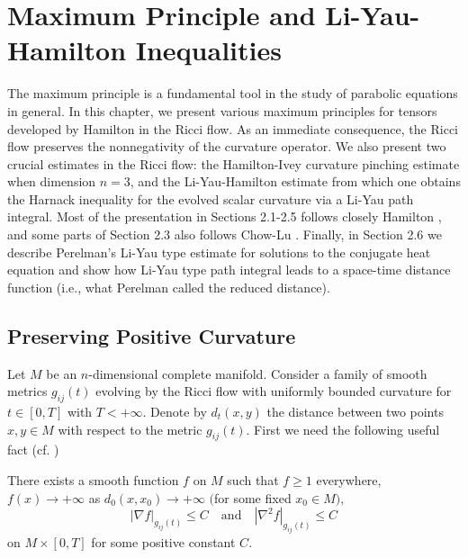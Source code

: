\chapter{Maximum Principle and Li-Yau-Hamilton Inequalities}
\label{chap:cz-maximum-principles}

\bigskip
The maximum principle is a fundamental tool in the study of
parabolic equations in general. In this chapter, we present
various maximum principles for tensors developed by Hamilton in
the Ricci flow. As an immediate consequence, the Ricci flow
preserves the nonnegativity of the curvature operator. We also
present two crucial estimates in the Ricci flow: the Hamilton-Ivey
curvature pinching estimate \cite{Ha95F, Iv} when dimension $n=3$,
and the Li-Yau-Hamilton estimate \cite{Ha88, Ha93} from which one
obtains the Harnack inequality for the evolved scalar curvature
via a Li-Yau \cite{LY} path integral. Most of the presentation in
Sections 2.1-2.5 follows closely Hamilton \cite{Ha82, Ha86, Ha88,
Ha93, Ha95F}, and some parts of Section 2.3 also follows Chow-Lu
\cite{Cl04}. Finally, in Section 2.6 we describe Perelman's Li-Yau
type estimate for solutions to the conjugate heat equation and
show how Li-Yau type path integral leads to a space-time distance
function (i.e., what Perelman \cite{P1} called the reduced
distance).


\section{Preserving Positive Curvature}

Let $M$ be an $n$-dimensional complete manifold. Consider a family
of smooth metrics $g_{ij}(t)$ evolving by the Ricci flow with
uniformly bounded curvature for $t\in[0,T]$ with $T<+\infty$.
Denote by $d_t(x,y)$ the distance between two points $x,y\in M$
with respect to the metric $g_{ij}(t)$. First we need the
following useful fact (cf. \cite{ScY})

\begin{lemma}
  \label{lem:cz-proper-exhaustion-with-uniformly-bounded-derivatives}
There exists a smooth function $f$ on $M$ such that $f\ge 1$
everywhere, $f(x)\rightarrow +\infty$ as $d_0(x,x_0)\rightarrow
+\infty$ $($for some fixed $x_0\in M),$
$$
|\nabla f|_{g_{ij}(t)}\le C \quad \text{and}\quad |\nabla^2
f|_{g_{ij}(t)}\le C
$$
on $M \times [0,T]$ for some positive constant $C$.
\end{lemma}

